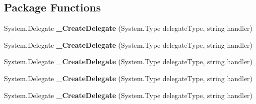 \subsection*{Package Functions}
\begin{DoxyCompactItemize}
\item 
\mbox{\label{class_teacher_handbook_1_1_main_window_a2cd23d6759ae818c7db481b1efb4bfbd}} 
System.\+Delegate {\bfseries \+\_\+\+Create\+Delegate} (System.\+Type delegate\+Type, string handler)
\item 
\mbox{\label{class_teacher_handbook_1_1_main_window_a2cd23d6759ae818c7db481b1efb4bfbd}} 
System.\+Delegate {\bfseries \+\_\+\+Create\+Delegate} (System.\+Type delegate\+Type, string handler)
\item 
\mbox{\label{class_teacher_handbook_1_1_main_window_a2cd23d6759ae818c7db481b1efb4bfbd}} 
System.\+Delegate {\bfseries \+\_\+\+Create\+Delegate} (System.\+Type delegate\+Type, string handler)
\item 
\mbox{\label{class_teacher_handbook_1_1_main_window_a2cd23d6759ae818c7db481b1efb4bfbd}} 
System.\+Delegate {\bfseries \+\_\+\+Create\+Delegate} (System.\+Type delegate\+Type, string handler)
\item 
\mbox{\label{class_teacher_handbook_1_1_main_window_a2cd23d6759ae818c7db481b1efb4bfbd}} 
System.\+Delegate {\bfseries \+\_\+\+Create\+Delegate} (System.\+Type delegate\+Type, string handler)
\end{DoxyCompactItemize}
